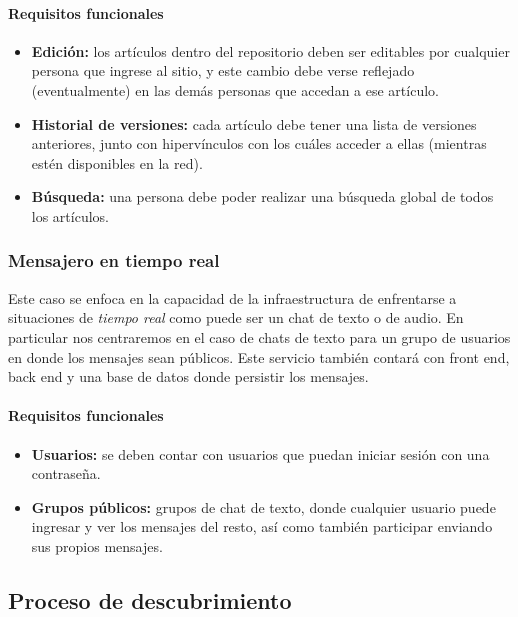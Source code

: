 \paragraph{Requisitos funcionales}

\begin{itemize}
    \item \textbf{Edición:} los artículos dentro del repositorio deben ser editables por cualquier persona que ingrese al sitio, y este cambio debe verse reflejado (eventualmente) en las demás personas que accedan a ese artículo.
    \item \textbf{Historial de versiones:} cada artículo debe tener una lista de versiones anteriores, junto con hipervínculos con los cuáles acceder a ellas (mientras estén disponibles en la red).
    \item \textbf{Búsqueda:} una persona debe poder realizar una búsqueda global de todos los artículos.
\end{itemize}

\subsubsection{Mensajero en tiempo real}

Este caso se enfoca en la capacidad de la infraestructura de enfrentarse a situaciones de \textit{tiempo real} como puede ser un chat de texto o de audio. En particular nos centraremos en el caso de chats de texto para un grupo de usuarios en donde los mensajes sean públicos. Este servicio también contará con front end, back end y una base de datos donde persistir los mensajes.

\paragraph{Requisitos funcionales}

\begin{itemize}
    \item \textbf{Usuarios:} se deben contar con usuarios que puedan iniciar sesión con una contraseña.
    \item \textbf{Grupos públicos:} grupos de chat de texto, donde cualquier usuario puede ingresar y ver los mensajes del resto, así como también participar enviando sus propios mensajes.
\end{itemize}

\subsection{Proceso de descubrimiento}

